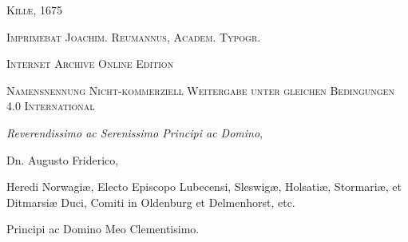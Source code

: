 \documentclass[a4paper, 11pt, oneside, polutonikogreek, german]{article}
\begin{document}
\begin{titlepage}
        \vspace*{\fill}

	\vspace{1\baselineskip}

	{\small\scshape Kiliæ, 1675}
	
	{\small\scshape{Imprimebat Joachim. Reumannus, Academ. Typogr.}}
	
	\vspace{0.5\baselineskip} %

        \scshape Internet Archive Online Edition%
    
	{\scshape\small Namensnennung Nicht-kommerziell Weitergabe unter gleichen Bedingungen 4.0 International} %
\end{titlepage}
\setlength{\parskip}{1mm plus1mm minus1mm}
\clearpage
\tableofcontents
\clearpage
\begin{center}
\emph{Reverendissimo ac Serenissimo Principi ac Domino},

Dn. Augusto Friderico,

{\footnotesize Heredi Norwagiæ, Electo Episcopo Lubecensi, Sleswigæ, Holsatiæ, Stormariæ, et Ditmarsiæ Duci, Comiti in Oldenburg et Delmenhorst, etc.}

Principi ac Domino Meo Clementisimo.
\end{center}
\end{document}
